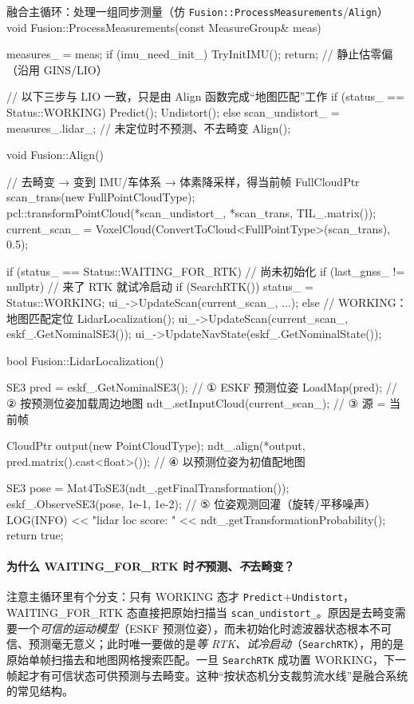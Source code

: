 \begin{codebox}[C++]{融合主循环：处理一组同步测量（仿 \texttt{Fusion::ProcessMeasurements}/\texttt{Align}）}
void Fusion::ProcessMeasurements(const MeasureGroup& meas) {
  measures_ = meas;
  if (imu_need_init_) { TryInitIMU(); return; }      // 静止估零偏（沿用 GINS/LIO）

  // 以下三步与 LIO 一致，只是由 Align 函数完成“地图匹配”工作
  if (status_ == Status::WORKING) { Predict(); Undistort(); }
  else { scan_undistort_ = measures_.lidar_; }       // 未定位时不预测、不去畸变
  Align();
}

void Fusion::Align() {
  // 去畸变 → 变到 IMU/车体系 → 体素降采样，得当前帧
  FullCloudPtr scan_trans(new FullPointCloudType);
  pcl::transformPointCloud(*scan_undistort_, *scan_trans, TIL_.matrix());
  current_scan_ = VoxelCloud(ConvertToCloud<FullPointType>(scan_trans), 0.5);

  if (status_ == Status::WAITING_FOR_RTK) {          // 尚未初始化
    if (last_gnss_ != nullptr) {                     // 来了 RTK 就试冷启动
      if (SearchRTK()) { status_ = Status::WORKING; ui_->UpdateScan(current_scan_, ...); }
    }
  } else {                                           // WORKING：地图匹配定位
    LidarLocalization();
    ui_->UpdateScan(current_scan_, eskf_.GetNominalSE3());
    ui_->UpdateNavState(eskf_.GetNominalState());
  }
}

bool Fusion::LidarLocalization() {
  SE3 pred = eskf_.GetNominalSE3();                   // ① ESKF 预测位姿
  LoadMap(pred);                                      // ② 按预测位姿加载周边地图
  ndt_.setInputCloud(current_scan_);                 // ③ 源 = 当前帧

  CloudPtr output(new PointCloudType);
  ndt_.align(*output, pred.matrix().cast<float>());  // ④ 以预测位姿为初值配地图

  SE3 pose = Mat4ToSE3(ndt_.getFinalTransformation());
  eskf_.ObserveSE3(pose, 1e-1, 1e-2);                // ⑤ 位姿观测回灌（旋转/平移噪声）
  LOG(INFO) << "lidar loc score: " << ndt_.getTransformationProbability();
  return true;
}
\end{codebox}

\paragraph{为什么 \textsf{WAITING\_FOR\_RTK} 时\emph{不}预测、\emph{不}去畸变？}
注意主循环里有个分支：只有 \textsf{WORKING} 态才 \texttt{Predict}+\texttt{Undistort}，\textsf{WAITING\_FOR\_RTK} 态直接把原始扫描当 \texttt{scan\_undistort\_}。原因是去畸变需要一个\emph{可信的运动模型}（ESKF 预测位姿），而未初始化时滤波器状态根本不可信、预测毫无意义；此时唯一要做的是\emph{等 RTK、试冷启动}（\texttt{SearchRTK}），用的是原始单帧扫描去和地图网格搜索匹配。一旦 \texttt{SearchRTK} 成功置 \textsf{WORKING}，下一帧起才有可信状态可供预测与去畸变。这种“按状态机分支裁剪流水线”是融合系统的常见结构。

